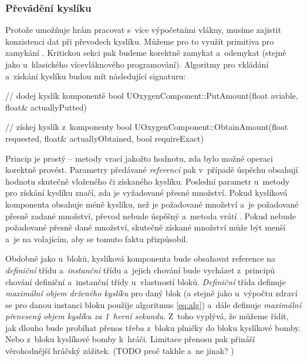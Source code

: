 \subsubsection{Převádění kyslíku}
Protože \UE{} umožňuje hrám pracovat s~více výpočetními vlákny, musíme zajistit konzistenci dat při převodech kyslíku. Můžeme pro to využít primitiva pro zamykání . Kritickou sekci pak budeme korektně zamykat a~odemykat (stejně jako u~klasického vícevláknového programování). Algoritmy pro vkládání a~získání kyslíku budou mít následující signaturu:

\begin{code}
    // dodej kyslík komponentě
    bool UOxygenComponent::PutAmount(float aviable,
                                     float& actuallyPutted)

    // získej kyslík z~komponenty                                     
    bool UOxygenComponent::ObtainAmount(float requested,
                                        float& actuallyObtained,
                                        bool requireExact)
\end{code}

Princip je prostý -- metody vrací  jakožto hodnotu, zda bylo možné operaci korektně provést. Parametry předávané \textit{referencí} pak v~případě úspěchu obsahují hodnotu skutečně vloženého či získaného kyslíku. Poslední parametr u~metody pro získání kyslíku značí, zda je vyžadované přesné množství. Pokud kyslíková komponenta obsahuje méně kyslíku, než je požadované množství a~je požadované přesně zadané množství, převod nebude úspěšný a~metoda vrátí . Pokud nebude požadované přesně dané množství, skutečně získané množství může být menší a~je na volajícím, aby se tomuto faktu přizpůsobil.

Obdobně jako u~bloků, kyslíková komponenta bude obsahovat reference na \textit{definiční} třídu a~\textit{instanční} třídu a~jejich chování bude vycházet z~principů chování definiční a~instanční třídy u~vlastností bloků. \textit{Definiční} třída definuje \textit{maximální objem drženého kyslíku} pro daný blok (a stejně jako u~výpočtu zdraví se pro danou instanci bloku použije algoritmus \ref{eq:alg}) a~dále definuje \textit{maximální přenesený objem kyslíku za 1~herní sekundu}. Z~toho vyplývá, že můžeme řídit, jak dlouho bude probíhat přenos třeba z~bloku plničky do bloku kyslíkové bomby. Nebo z~bloku kyslíkové bomby k~hráči. Limitace přenosu pak přináší věrohodnější hráčský zážitek. (TODO proč takhle a~ne jinak? )

